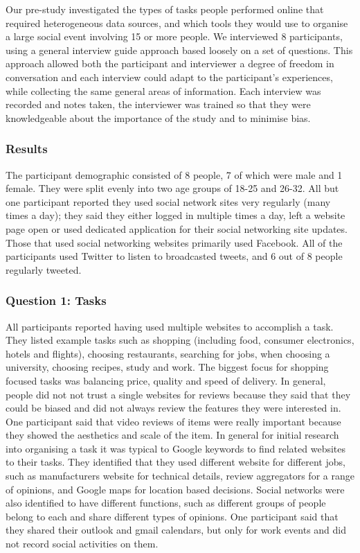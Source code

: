 \documentclass{sigchi}
\begin{document}
Our pre-study investigated the types of tasks people performed online that required heterogeneous data sources, and which tools they would use to organise a large social event involving 15 or more people.  We interviewed 8 participants, using a general interview guide approach based loosely on a set of questions.  This approach allowed both the participant and interviewer a degree of freedom in conversation and each interview could adapt to the participant's experiences, while collecting the same general areas of information.  Each interview was recorded and notes taken, the interviewer was trained so that they were knowledgeable about the importance of the study and to minimise bias.

\subsubsection{Results}
The participant demographic consisted of 8 people, 7 of which were male and 1 female.  They were split evenly into two age groups of 18-25 and 26-32.  All but one participant reported they used social network sites very regularly (many times a day); they said they either logged in multiple times a day, left a website page open or used dedicated application for their social networking site updates.  Those that used social networking websites primarily used Facebook.  All of the participants used Twitter to listen to broadcasted tweets, and 6 out of 8 people regularly tweeted. 

\subsubsection{Question 1: Tasks}
All participants reported having used multiple websites to accomplish a task.  They listed example tasks such as shopping (including food, consumer electronics, hotels and flights), choosing restaurants, searching for jobs, when choosing a university, choosing recipes, study and work.  The biggest focus for shopping focused tasks was balancing price, quality and speed of delivery.  In general, people did not not trust a single websites for reviews because they said that they could be biased and did not always review the features they were interested in.  One participant said that video reviews of items were really important because they showed the aesthetics and scale of the item.  In general for initial research into organising a task it was typical to Google keywords to find related websites to their tasks.  They identified that they used different website for different jobs, such as manufacturers website for technical details, review aggregators for a range of opinions, and Google maps for location based decisions.  Social networks were also identified to have different functions, such as different groups of people belong to each and share different types of opinions.  One participant said that they shared their outlook and gmail calendars, but only for work events and did not record social activities on them.
\end{document}
